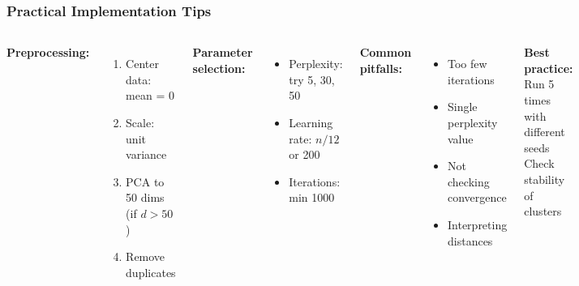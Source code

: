 \documentclass[aspectratio=169]{beamer}
\begin{document}
\begin{frame}
\frametitle{Practical Implementation Tips}
\begin{columns}[T]
\textbf{Preprocessing:}
\begin{enumerate}
\small
\item Center data: mean = 0
\item Scale: unit variance
\item PCA to 50 dims (if $d > 50$)
\item Remove duplicates
\end{enumerate}

\vspace{0.3cm}
\textbf{Parameter selection:}
\begin{itemize}
\small
\item Perplexity: try 5, 30, 50
\item Learning rate: $n/12$ or 200
\item Iterations: min 1000
\end{itemize}

\textbf{Common pitfalls:}
\begin{itemize}
\small
\item Too few iterations
\item Single perplexity value
\item Not checking convergence
\item Interpreting distances
\end{itemize}

\vspace{0.3cm}
\textbf{Best practice:}\\
\small Run 5 times with different seeds\\
Check stability of clusters
\end{columns}
\end{frame}
\end{document}
